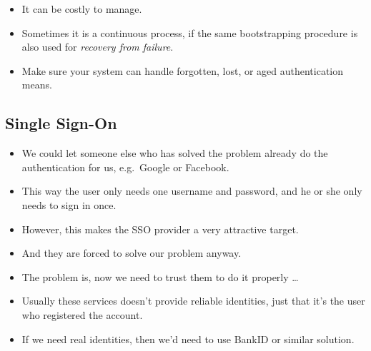 \documentclass{beamer}
\begin{document}
\begin{frame}
  \begin{itemize}
    \item It can be costly to manage.

    \item Sometimes it is a continuous process, if the same bootstrapping 
      procedure is also used for \emph{recovery from failure}.

    \item Make sure your system can handle forgotten, lost, or aged 
      authentication means.

  \end{itemize}
\end{frame}

\subsection{Single Sign-On}

\begin{frame}
  \begin{itemize}
    \item We could let someone else who has solved the problem already do the 
      authentication for us, e.g.\ Google or Facebook.

    \item This way the user only needs one username and password, and he or she 
      only needs to sign in once.

    \item However, this makes the SSO provider a very attractive target.

    \item And they are forced to solve our problem anyway.

    \item The problem is, now we need to trust them to do it properly \dots
  \end{itemize}
\end{frame}

\begin{frame}
  \begin{itemize}
    \item Usually these services doesn't provide reliable identities, just that 
      it's the user who registered the account.

    \item If we need real identities, then we'd need to use BankID or similar 
      solution.
  \end{itemize}
\end{frame}
\end{document}
